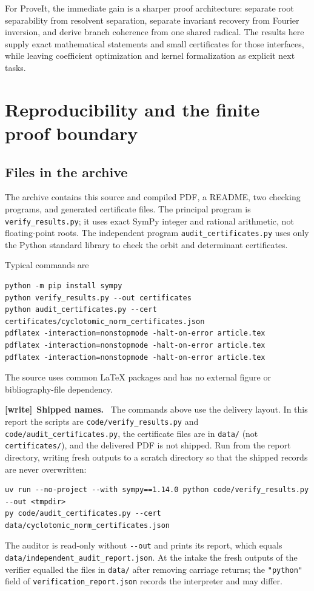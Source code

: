 \documentclass[11pt,a4paper]{article}
\theoremstyle{definition}
\theoremstyle{remark}
\newcommand{\code}[1]{{\small\nolinkurl{#1}}}
\newenvironment{writenote}[1][]{\par\smallskip\begingroup\small
 \noindent\textbf{[write]}\if\relax\detokenize{#1}\relax\else~\textbf{#1.}\fi\ }%
 {\par\endgroup\smallskip}
\begin{document}
For ProveIt, the immediate gain is a sharper proof architecture: separate
root separability from resolvent separation, separate invariant recovery
from Fourier inversion, and derive branch coherence from one shared
radical. The results here supply exact mathematical statements and small
certificates for those interfaces, while leaving coefficient optimization
and kernel formalization as explicit next tasks.

\appendix
\section{Reproducibility and the finite proof boundary}
\label{rss:app:repro}

\subsection{Files in the archive}

The archive contains this source and compiled PDF, a README, two checking
programs, and generated certificate files. The principal program is
\code{verify_results.py}; it uses exact SymPy integer and rational
arithmetic, not floating-point roots. The independent program
\code{audit_certificates.py} uses only the Python standard library to check
the orbit and determinant certificates.

Typical commands are
\begin{lstlisting}
python -m pip install sympy
python verify_results.py --out certificates
python audit_certificates.py --cert certificates/cyclotomic_norm_certificates.json
pdflatex -interaction=nonstopmode -halt-on-error article.tex
pdflatex -interaction=nonstopmode -halt-on-error article.tex
pdflatex -interaction=nonstopmode -halt-on-error article.tex
\end{lstlisting}
The source uses common LaTeX packages and has no external figure or
bibliography-file dependency.

\begin{writenote}[Shipped names]
The commands above use the delivery layout. In this report the scripts are
\code{code/verify_results.py} and \code{code/audit_certificates.py}, the
certificate files are in \code{data/} (not \code{certificates/}), and the
delivered PDF is not shipped. Run from the report directory, writing fresh
outputs to a scratch directory so that the shipped records are never
overwritten:
\begin{lstlisting}
uv run --no-project --with sympy==1.14.0 python code/verify_results.py --out <tmpdir>
py code/audit_certificates.py --cert data/cyclotomic_norm_certificates.json
\end{lstlisting}
The auditor is read-only without \code{--out} and prints its report, which
equals \code{data/independent_audit_report.json}. At the intake the fresh
outputs of the verifier equalled the files in \code{data/} after removing
carriage returns; the \code{"python"} field of
\code{verification_report.json} records the interpreter and may differ.
\end{writenote}
\end{document}
